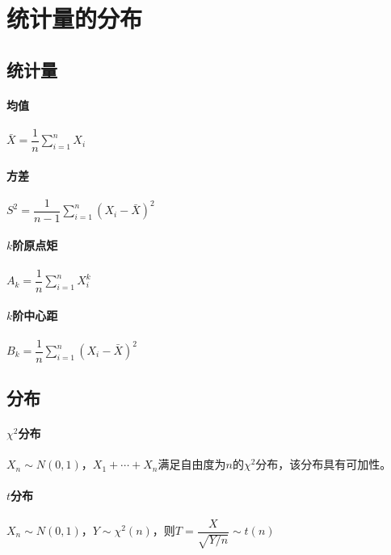 

\section{统计量的分布}

\subsection{统计量}

\paragraph{均值}
$\bar{X} = \dfrac{1}{n} \sum\limits_{i=1}^{n} X_{i}$



\paragraph{方差}
$S^{2} = \dfrac{1}{n-1} \sum\limits_{i=1}^{n} \left( X_{i} - \bar{X} \right)^{2}$

\paragraph{$k$阶原点矩}
$A_{k} = \dfrac{1}{n} \sum\limits_{i=1}^{n} X_{i}^{k}$

\paragraph{$k$阶中心距}
$B_{k} = \dfrac{1}{n} \sum\limits_{i=1}^{n} \left( X_{i} - \bar{X} \right)^{2}$

\subsection{分布}

\paragraph{$\chi^2$分布}

$X_{n} \sim N \left( 0,1 \right)$，$X_{1} + \cdots + X_{n}$满足自由度为$n$的$\chi^{2}$分布，该分布具有可加性。

\paragraph{$t$分布}

$X_{n} \sim N \left( 0,1 \right)$，$Y \sim \chi^{2} (n)$，则$T=\dfrac{X}{\sqrt{Y/n}} \sim t(n)$

